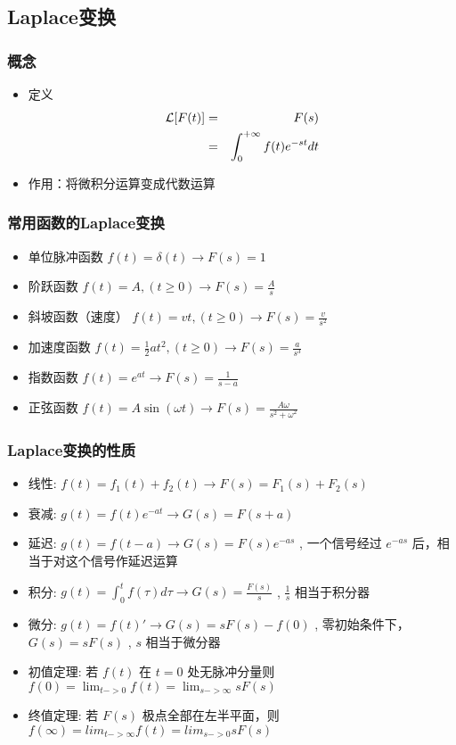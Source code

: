 \documentclass{article}
\begin{document}
\subsection{Laplace变换}
\label{sec-2-1}
\begin{frame}
\frametitle{概念}
\label{sec-2-1-1}

\begin{itemize}
\item <2->定义
       \begin{eqnarray*}
       {\cal L}[F(t)] &=& F(s) \\
       	&=& \int_0^{+\infty}f(t)e^{-st}dt
       \end{eqnarray*}
\item <3->作用：将微积分运算变成代数运算
\end{itemize}
\end{frame}
\begin{frame}
\frametitle{常用函数的Laplace变换}
\label{sec-2-1-2}

\begin{itemize}
\item <2->单位脉冲函数 $f(t)=\delta(t) \rightarrow   F(s)=1$
\item <3->阶跃函数 $f(t)=A,(t\geq 0) \rightarrow   F(s)=\frac{A}{s}$
\item <4->斜坡函数（速度）  $f(t)=vt,(t\geq0) \rightarrow F(s)=\frac{v}{s^2}$
\item <5->加速度函数  $f(t)=\frac{1}{2}at^2,(t\geq 0) \rightarrow  F(s)=\frac{a}{s^3}$
\item <6->指数函数 $f(t)=e^{at} \rightarrow  F(s)=\frac{1}{s-a}$
\item <7->正弦函数 $f(t)=A\sin(\omega t)\rightarrow F(s)=\frac{A\omega}{s^2+\omega^2}$
\end{itemize}
\end{frame}
\begin{frame}
\frametitle{Laplace变换的性质}
\label{sec-2-1-3}

\begin{itemize}
\item <2->线性: $f(t)=f_1(t)+f_2(t)\rightarrow  F(s)=F_1(s)+F_2(s)$
\item <3->衰减: $g(t)=f(t)e^{-at} \rightarrow G(s)=F(s+a)$
\item <4->延迟: $g(t)=f(t-a) \rightarrow  G(s)=F(s)e^{-as}$ , 一个信号经过 $e^{-as}$ 后，相当于对这个信号作延迟运算
\item <5->积分: $g(t)=\int_0^t f(\tau) d\tau \rightarrow  G(s)=\frac{F(s)}{s}$ , $\frac{1}{s}$ 相当于积分器
\item <6->微分: $g(t)=f(t)'\rightarrow  G(s)=sF(s)-f(0)$ , 零初始条件下， $G(s)=sF(s)$ , $s$ 相当于微分器
\item <7->初值定理: 若 $f(t)$ 在 $t=0$ 处无脉冲分量则 $f(0)=\lim_{t->0}f(t)=\lim_{s->\infty}sF(s)$
\item <8->终值定理: 若 $F(s)$ 极点全部在左半平面，则 $f(\infty)=lim_{t->\infty}f(t)=lim_{s->0}sF(s)$
\end{itemize}
\end{frame}
\end{document}

